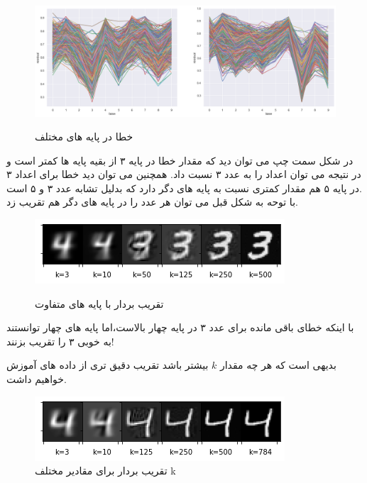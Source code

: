  	 \begin{figure}[h]
 		\centering
 		\includegraphics[width=\linewidth]{assets/3_7_bases.png} \\[10pt]
 		\caption{خطا در پایه های مختلف}
 	\end{figure}
 	در شکل سمت چپ می توان دید که مقدار خطا در پایه ۳ از بقیه پایه ها کمتر است و در نتیجه می توان اعداد را به عدد ۳ نسبت داد. همچنین می توان دید خطا برای اعداد ۳ در پایه ۵ هم مقدار کمتری نسبت به پایه های دگر دارد که بدلیل تشابه عدد ۳ و ۵ است.\\[5pt]
 	با توحه به شکل قبل می توان هر عدد را در پایه های دگر هم تقریب زد. \\
 	 
 	\begin{figure}[h]
 		\centering
 		\includegraphics[width=\linewidth]{assets/4_with_3.png} \\[10pt]
 		\caption{تقریب بردار با پایه های متفاوت}
 	\end{figure}
 با اینکه خطای باقی مانده برای عدد ۳ در پایه چهار بالاست،‌اما پایه های چهار توانستند به خوبی ۳ را تقریب بزنند! 
 	
 	\pagebreak
 	بدیهی است که هر چه مقدار $ k $ بیشتر باشد تقریب دقیق تری از داده های آموزش خواهیم داشت.
 	
 	\begin{figure}[h]
 		\centering
 		\includegraphics[width=0.8\linewidth]{assets/more_bases_better.png}
 		\caption{تقریب بردار برای مقادیر مختلف k}
 	\end{figure}
 	
